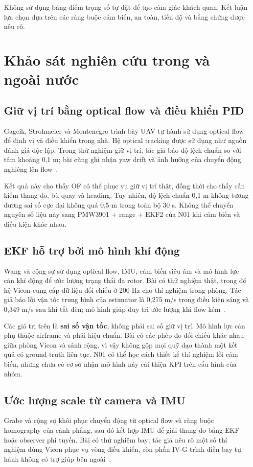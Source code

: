\documentclass[a4paper,12pt]{article}
\begin{document}
Không sử dụng bảng điểm trọng số tự đặt để tạo cảm giác khách quan. Kết luận lựa chọn dựa trên các ràng buộc cảm biến, an toàn, tiến độ và bằng chứng được nêu rõ.

\section{Khảo sát nghiên cứu trong và ngoài nước}
\subsection{Giữ vị trí bằng optical flow và điều khiển PID}
Gageik, Strohmeier và Montenegro trình bày UAV tự hành sử dụng optical flow để định vị và điều khiển trong nhà. Hệ optical tracking được sử dụng như nguồn đánh giá độc lập. Trong thử nghiệm giữ vị trí, tác giả báo độ lệch chuẩn so với tâm khoảng 0,1 m; bài cũng ghi nhận yaw drift và ảnh hưởng của chuyển động nghiêng lên flow~\cite{source4}.

Kết quả này cho thấy OF có thể phục vụ giữ vị trí thật, đồng thời cho thấy cần kiểm thang đo, bù quay và heading. Tuy nhiên, độ lệch chuẩn 0,1 m không tương đương sai số cực đại không quá 0,5 m trong toàn bộ 30 s. Không thể chuyển nguyên số liệu này sang PMW3901 + range + EKF2 của N01 khi cảm biến và điều kiện khác nhau.

\subsection{EKF hỗ trợ bởi mô hình khí động}
Wang và cộng sự sử dụng optical flow, IMU, cảm biến siêu âm và mô hình lực cản khí động để ước lượng trạng thái đa rotor. Bài có thử nghiệm thật, trong đó hệ Vicon cung cấp dữ liệu đối chiếu ở 200 Hz cho thí nghiệm trong phòng. Tác giả báo lỗi vận tốc trung bình của estimator là 0,275 m/s trong điều kiện sáng và 0,349 m/s sau khi tắt đèn; mô hình giúp duy trì ước lượng khi flow kém~\cite{source5}.

Các giá trị trên là \textbf{sai số vận tốc}, không phải sai số giữ vị trí. Mô hình lực cản phụ thuộc airframe và phải hiệu chuẩn. Bài có các phép đo đối chiếu khác nhau giữa phòng Vicon và sảnh rộng, vì vậy không gộp mọi quỹ đạo thành một kết quả có ground truth liên tục. N01 có thể học cách thiết kế thí nghiệm lỗi cảm biến, nhưng chưa có cơ sở nhận mô hình này cải thiện KPI trên cấu hình của nhóm.

\subsection{Ước lượng scale từ camera và IMU}
Grabe và cộng sự khôi phục chuyển động từ optical flow và ràng buộc homography của cảnh phẳng, sau đó kết hợp IMU để giải thang đo bằng EKF hoặc observer phi tuyến. Bài có thử nghiệm bay; tác giả nêu rõ một số thí nghiệm dùng Vicon phục vụ vòng điều khiển, còn phần IV-G trình diễn bay tự hành không có trợ giúp bên ngoài~\cite{source6}.
\end{document}
